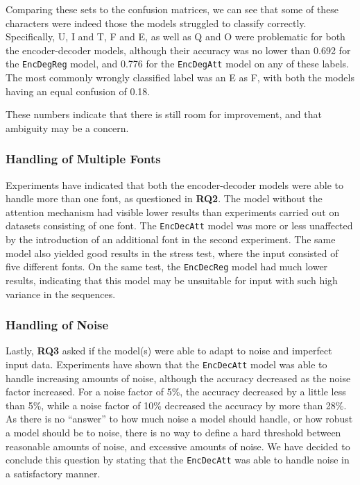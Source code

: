 Comparing these sets to the confusion matrices, we can see that some of these characters were indeed those the models struggled to classify correctly. Specifically, U, I and T, F and E, as well as Q and O were problematic for both the encoder-decoder models, although their accuracy was no lower than 0.692 for the {\tt EncDegReg} model, and 0.776 for the {\tt EncDegAtt} model on any of these labels. The most commonly wrongly classified label was an E as F, with both the models having an equal confusion of 0.18. 

These numbers indicate that there is still room for improvement, and that ambiguity may be a concern.

\newpage
\subsubsection{Handling of Multiple Fonts}
Experiments have indicated that both the encoder-decoder models were able to handle more than one font, as questioned in \textbf{RQ2}. The model without the attention mechanism had visible lower results than experiments carried out on datasets consisting of one font. The {\tt EncDecAtt} model was more or less unaffected by the introduction of an additional font in the second experiment. The same model also yielded good results in the stress test, where the input consisted of five different fonts. On the same test, the {\tt EncDecReg} model had much lower results, indicating that this model may be unsuitable for input with such high variance in the sequences.

\subsubsection{Handling of Noise}
Lastly, \textbf{RQ3} asked if the model(s) were able to adapt to noise and imperfect input data. Experiments have shown that the {\tt EncDecAtt} model was able to handle increasing amounts of noise, although the accuracy decreased as the noise factor increased. For a noise factor of 5\%, the accuracy decreased by a little less than 5\%, while a noise factor of 10\% decreased the accuracy by more than 28\%. As there is no ``answer'' to how much noise a model should handle, or how robust a model should be to noise, there is no way to define a hard threshold between reasonable amounts of noise, and excessive amounts of noise. We have decided to conclude this question by stating that the {\tt EncDecAtt} was able to handle noise in a satisfactory manner. 

